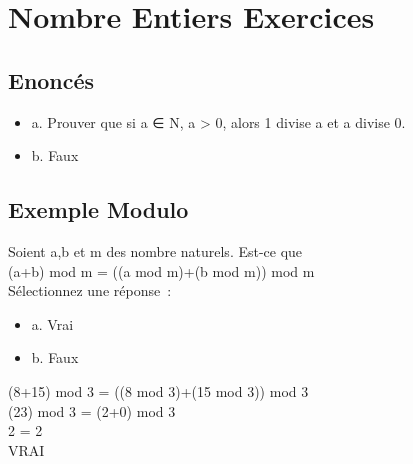 \newpage

\chapter{Nombre Entiers Exercices}

\vspace{3mm} %
\section{Enoncés}
\vspace{3mm} %

\begin{itemize}
\item {a. Prouver que si a ∈ N, a > 0, alors 1 divise a et a divise 0. }
\item {b. Faux}
\end{itemize}

\section{Exemple Modulo}
\vspace{3mm} %

Soient a,b et m des nombre naturels. Est-ce que\\
(a+b) mod m = ((a mod m)+(b mod m)) mod m \\

Sélectionnez une réponse : \\

\begin{itemize}[label=$\square$]
\item {a. Vrai}
\item {b. Faux}
\end{itemize}

(8+15) mod 3 = ((8 mod 3)+(15 mod 3)) mod 3 \\
(23) mod 3 = (2+0) mod 3 \\
2 = 2 \\
VRAI \\
